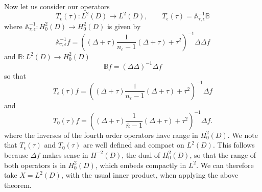 \documentclass[10pt,a4paper]{amsart}
\begin{document}
Now let us consider our operators 
\begin{equation}\label{Te2}
 T_\epsilon (\tau): L^2(D) \to L^2(D),\qquad  T_\epsilon (\tau) =  \mathbb{A}_{\tau,\epsilon}^{-1} \mathbb{B}
 \end{equation}
 where  $\mathbb{A}_{\tau,\epsilon}^{-1}: H_0^2(D)\to H^2_0(D)$ is given by 
$$ \mathbb{A}_{\tau,\epsilon}^{-1} f  = \left( (\Delta +\tau ) \frac{1}{n_\epsilon-1} (\Delta +\tau ) +\tau^2 \right)^{-1}\Delta\Delta f $$
and $\mathbb{B}:L^2(D)\to H^2_0(D)$
$$ \mathbb{B}f = (\Delta\Delta)^{-1}\Delta f$$
so that 
\begin{equation}\label{Te3}
 T_\epsilon (\tau) f = \left( (\Delta +\tau ) \frac{1}{n_\epsilon-1} (\Delta +\tau ) +\tau^2 \right)^{-1}\Delta f 
 \end{equation}
 and
 \begin{equation}\label{T03}
 T_0 (\tau) f = \left( (\Delta +\tau ) \frac{1}{\overline{n}-1} (\Delta +\tau ) +\tau^2 \right)^{-1}\Delta f .
 \end{equation}
where the inverses of the fourth order operators have range in $H^2_0(D)$.  We note that $T_\epsilon(\tau)$ and $T_0(\tau)$ are well defined and compact on $L^2(D)$. This follows because $\Delta f $ makes sense in $H^{-2}(D)$, the dual of $H^2_0(D)$, so that the range of both operators is in $H^2_0(D)$, which embeds compactly in $L^2$.  We can therefore take $X=L^2(D)$, with the usual inner product, when applying the above theorem.  
\end{document}
